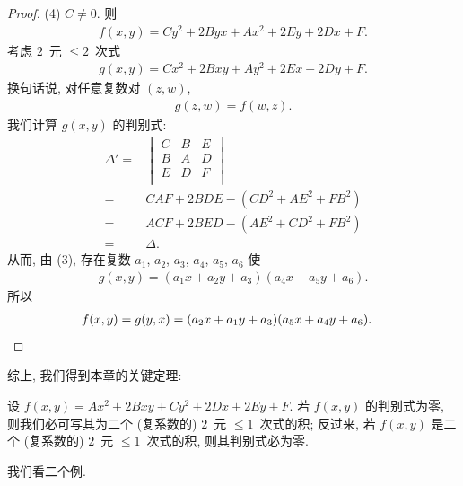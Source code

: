 \documentclass[%
    UTF8,%
    fontset=none,%
    punct=kaiming,%
    zihao=-4,%
    a4paper,%
    oneside,%
]{ctexbook}
\renewcommand*{\leq}{\leqslant}
\begin{document}
\begin{proof}
    (4)
    \(C \neq 0\).
    则
    \begin{align*}
        f(x, y) = Cy^2 + 2Byx + Ax^2 + 2Ey + 2Dx + F.
    \end{align*}
    考虑 \(2\)~元 \({\leq} 2\)~次式
    \begin{align*}
        g(x, y) = Cx^2 + 2Bxy + Ay^2 + 2Ex + 2Dy + F.
    \end{align*}
    换句话说, 对任意复数对 \((z, w)\),
    \begin{align*}
        g(z, w) = f(w, z).
    \end{align*}
    我们计算 \(g(x, y)\) 的判别式:
    \begin{align*}
        \Delta'
        = {} &
        \begin{vmatrix}
            C & B & E \\
            B & A & D \\
            E & D & F \\
        \end{vmatrix}                           \\
        = {} & CAF + 2BDE - (CD^2 + AE^2 + FB^2) \\
        = {} & ACF + 2BED - (AE^2 + CD^2 + FB^2) \\
        = {} & \Delta.
    \end{align*}
    从而, 由 (3),
    存在复数
    \(a_1\), \(a_2\), \(a_3\), \(a_4\), \(a_5\), \(a_6\)
    使
    \begin{align*}
        g(x, y) = (a_1 x + a_2 y + a_3) (a_4 x + a_5 y + a_6).
    \end{align*}
    所以
    \begin{align*}
         &
        f(x, y) = g(y, x) = (a_2 x + a_1 y + a_3) (a_5 x + a_4 y + a_6).
        \qedhere
    \end{align*}
\end{proof}

综上, 我们得到本章的关键定理:

\begin{theorem}
    设 \(f(x, y) = Ax^2 + 2Bxy + Cy^2 + 2Dx + 2Ey + F\).
    若 \(f(x, y)\) 的判别式为零,
    则我们必可写其为二个 (复系数的)
    \(2\)~元 \({\leq} 1\)~次式的积;
    反过来,
    若 \(f(x, y)\) 是二个 (复系数的)
    \(2\)~元 \({\leq} 1\)~次式的积,
    则其判别式必为零.
\end{theorem}

我们看二个例.
\end{document}
